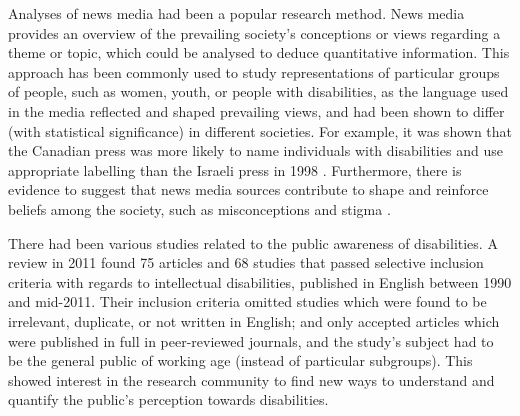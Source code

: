 \documentclass{report}
\begin{document}
Analyses of news media had been a popular research method.
News media provides an overview of the prevailing society's conceptions or views regarding a theme or topic, which could be analysed to deduce quantitative information.
This approach has been commonly used to study representations of particular groups of people, such as women, youth, or people with disabilities, as the language used in the media reflected and shaped prevailing views, and had been shown to differ (with statistical significance) in different societies.
For example, it was shown that the Canadian press was more likely to name individuals with disabilities and use appropriate labelling than the Israeli press in 1998 \cite{gold1999media}.
Furthermore, there is evidence to suggest that news media sources contribute to shape and reinforce beliefs among the society, such as misconceptions and stigma \cite{wahl1992mass}.

There had been various studies related to the public awareness of disabilities.
A review in 2011 \cite{scior2011public} found 75 articles and 68 studies that passed selective inclusion criteria with regards to intellectual disabilities, published in English between 1990 and mid-2011. 
Their inclusion criteria omitted studies which were found to be irrelevant, duplicate, or not written in English; and only accepted articles which were published in full in peer-reviewed journals, and the study's subject had to be the general public of working age (instead of particular subgroups).
This showed interest in the research community to find new ways to understand and quantify the public's perception towards disabilities.
\end{document}
